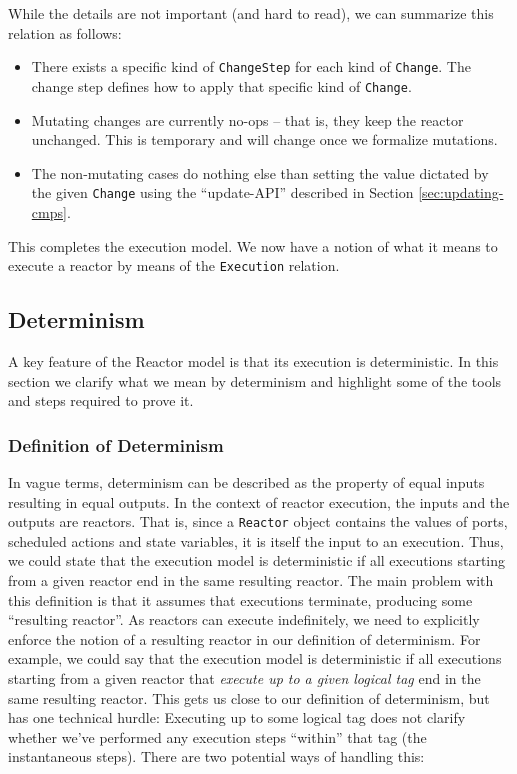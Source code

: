 While the details are not important (and hard to read), we can summarize this relation as follows:

\begin{itemize}
  \item There exists a specific kind of \lstinline{ChangeStep} for each kind of \lstinline{Change}.
        The change step defines how to apply that specific kind of \lstinline{Change}.
  \item Mutating changes are currently no-ops -- that is, they keep the reactor unchanged.
        This is temporary and will change once we formalize mutations.
  \item The non-mutating cases do nothing else than setting the value dictated by the given \lstinline{Change} using the ``update-API'' described in Section \ref{sec:updating-cmps}.
\end{itemize}

This completes the execution model.
We now have a notion of what it means to execute a reactor by means of the \lstinline{Execution} relation.

\subsection{Determinism}

A key feature of the Reactor model is that its execution is deterministic.
In this section we clarify what we mean by determinism and highlight some of the tools and steps required to prove it.

\subsubsection{Definition of Determinism}

In vague terms, determinism can be described as the property of equal inputs resulting in equal outputs.
In the context of reactor execution, the inputs and the outputs are reactors.
That is, since a \lstinline{Reactor} object contains the values of ports, scheduled actions and state variables, it is itself the input to an execution.
Thus, we could state that the execution model is deterministic if all executions starting from a given reactor end in the same resulting reactor.
The main problem with this definition is that it assumes that executions terminate, producing some ``resulting reactor''.
As reactors can execute indefinitely, we need to explicitly enforce the notion of a resulting reactor in our definition of determinism.
For example, we could say that the execution model is deterministic if all executions starting from a given reactor that \emph{execute up to a given logical tag} end in the same resulting reactor.
This gets us close to our definition of determinism, but has one technical hurdle: 
Executing up to some logical tag does not clarify whether we've performed any execution steps ``within'' that tag (the instantaneous steps).
There are two potential ways of handling this:


